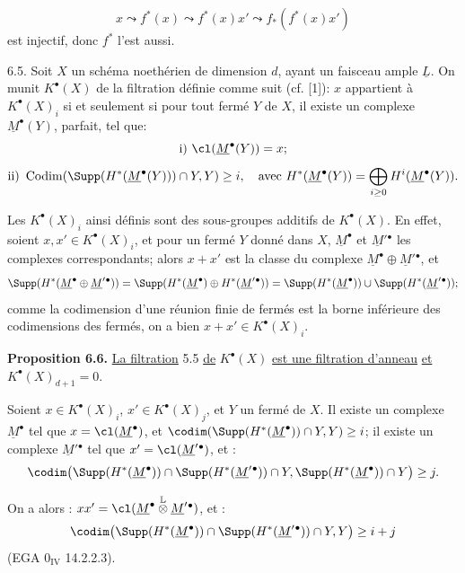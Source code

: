 
\[
  x\leadsto f^*(x)\leadsto f^*(x)x'\leadsto f_*(f^*(x)x')
\]
est
injectif, donc $f^*$ l'est aussi.

6.5. Soit $X$ un schéma noethérien de dimension $d$, ayant un faisceau ample $\underline{L}$. On munit $K^{\bullet}(X)$ de la filtration définie comme suit (cf. [1]): $x$ appartient à $K^{\bullet}(X)_i$ si et seulement si pour tout fermé $Y$ de $X$, il existe un complexe $\underline{M}^\bullet(Y)$, parfait, tel que:
\[
  \text{i) } \cl(\underline{M}^\bullet(Y))=x;
\]
\[
  \text{ii) } \operatorname{Codim}(\Supp(H^*(\underline{M}^\bullet(Y)))\cap Y,Y)\ge i,
  \quad\text{avec } H^*(\underline{M}^\bullet(Y))=\bigoplus_{i\ge0}H^i(\underline{M}^\bullet(Y)).
\]

Les $K^{\bullet}(X)_i$ ainsi définis sont des sous-groupes additifs de $K^{\bullet}(X)$. En effet, soient $x,x'\in K^{\bullet}(X)_i$, et pour un fermé $Y$ donné dans $X$, $\underline{M}^\bullet$ et $\underline{M}'{}^\bullet$ les complexes correspondants; alors $x+x'$ est la classe du complexe $\underline{M}^\bullet\oplus \underline{M}'{}^\bullet$, et
\[
\Supp(H^*(\underline{M}^\bullet\oplus \underline{M}'{}^\bullet))
 =\Supp(H^*(\underline{M}^\bullet)\oplus H^*(\underline{M}'{}^\bullet))
 =\Supp(H^*(\underline{M}^\bullet))\cup\Supp(H^*(\underline{M}'{}^\bullet));
\]
comme la codimension d'une réunion finie de fermés est la borne inférieure des codimensions des fermés, on a bien $x+x'\in K^{\bullet}(X)_i$.

\textbf{Proposition 6.6.} \uline{La filtration} 5.5 \uline{de} $K^{\bullet}(X)$ \uline{est une filtration d'anneau} \uline{et} $K^{\bullet}(X)_{d+1}=0$.

Soient $x\in K^{\bullet}(X)_i$, $x'\in K^{\bullet}(X)_j$, et $Y$ un fermé de $X$. Il existe un complexe $\underline{M}^\bullet$ tel que $x=\cl(\underline{M}^\bullet)$, et $\codim(\Supp(H^*(\underline{M}^\bullet))\cap Y,Y)\ge i$; il existe un complexe $\underline{M}'{}^\bullet$ tel que $x'=\cl(\underline{M}'{}^\bullet)$, et :
\[
\codim\bigl(\Supp(H^*(\underline{M}^\bullet))\cap\Supp(H^*(\underline{M}'{}^\bullet))\cap Y,
            \Supp(H^*(\underline{M}^\bullet))\cap Y\bigr)\ge j.
\]

On a alors : $xx'=\cl(\underline{M}^\bullet\overset{\mathbb L}{\otimes}\underline{M}'{}^\bullet)$, et :
\[
\codim\bigl(\Supp(H^*(\underline{M}^\bullet))\cap\Supp(H^*(\underline{M}'{}^\bullet))\cap Y,Y\bigr)\ge i+j
\]
(EGA $0_{\mathrm{IV}}$ 14.2.2.3).
